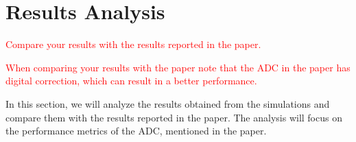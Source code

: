 \section{Results Analysis}
\label{sec:results}
\textcolor{red}{Compare your results with the results reported in the paper.}

\textcolor{red}{When comparing your results with the paper note that the ADC in the paper has digital correction, which can result in a better performance.}

In this section, we will analyze the results obtained from the simulations and compare them with the results reported in the paper. The analysis will focus on the performance metrics of the ADC, mentioned in the paper.